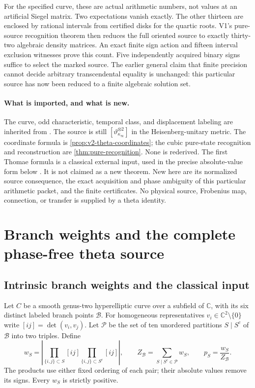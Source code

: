 \documentclass[11pt]{article}
\theoremstyle{definition}
\theoremstyle{remark}
\newcommand{\C}{\mathbb C}
\begin{document}
For the specified curve, these are actual arithmetic numbers, not values at
an artificial Siegel matrix. Two expectations vanish exactly. The other
thirteen are enclosed by rational intervals from certified disks for the
quartic roots. V1's pure-source recognition theorem then reduces the full
oriented source to exactly thirty-two algebraic density matrices. An exact
finite sign action and fifteen interval exclusion witnesses prove this count.
Five independently acquired binary signs suffice to select the marked
source. The earlier general claim that finite precision cannot decide
arbitrary transcendental equality is unchanged: this particular source has
now been reduced to a finite algebraic solution set.

\paragraph{What is imported, and what is new.}
The curve, odd characteristic, temporal class, and displacement labeling are
inherited from \cite{AD9}. The source is still
$[\vartheta_{\kappa_\infty}^{\otimes2}]$ in the Heisenberg-unitary metric.
The coordinate formula is \cref{prop:v2-theta-coordinates}; the cubic
pure-state recognition and reconstruction are \cref{thm:pure-recognition}.
None is rederived. The first Thomae formula is a classical external input,
used in the precise absolute-value form below \cite[\S2.6, Eq.~(18)]{BernatskaThomae}.
It is not claimed as a new theorem. New here are its normalized source
consequence, the exact acquisition and phase ambiguity of this particular
arithmetic packet, and the finite certificates. No physical source,
Frobenius map, connection, or transfer is supplied by a theta identity.

\section{Branch weights and the complete phase-free theta source}
\label{sec:v3-thomae-source}

\subsection{Intrinsic branch weights and the classical input}
Let $C$ be a smooth genus-two hyperelliptic curve over a subfield of $\C$,
with its six distinct labeled branch points $\mathcal B$. For homogeneous
representatives $v_i\in\C^2\setminus\{0\}$ write
$[ij]=\det(v_i,v_j)$. Let $\mathcal P$ be the set of ten unordered
partitions $S\mid S^c$ of $\mathcal B$ into two triples. Define
\begin{equation}
 w_S=\left|\prod_{\{i,j\}\subset S}[ij]
                \prod_{\{i,j\}\subset S^c}[ij]\right|,
 \qquad Z_{\mathcal B}=\sum_{S\mid S^c\in\mathcal P}w_S,
 \qquad p_S=\frac{w_S}{Z_{\mathcal B}}.
 \label{eq:v3-branch-weights}
\end{equation}
The products use either fixed ordering of each pair; their absolute values
remove its signs. Every $w_S$ is strictly positive.
\end{document}
